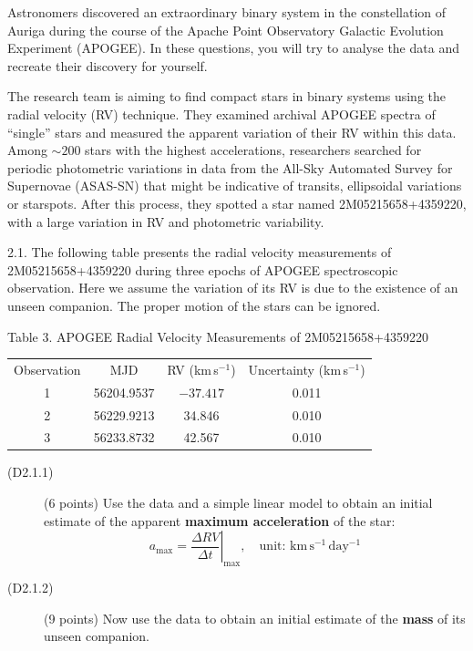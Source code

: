 Astronomers discovered an extraordinary binary system in the constellation of
Auriga during the course of the Apache Point Observatory Galactic Evolution
Experiment (APOGEE). In these questions, you will try to analyse the data and
recreate their discovery for yourself.

The research team is aiming to find compact stars in binary systems using the
radial velocity (RV) technique. They examined archival APOGEE spectra of
``single'' stars and measured the apparent variation of their RV within this
data. Among ${\sim}200$ stars with the highest accelerations, researchers
searched for periodic photometric variations in data from the All-Sky
Automated Survey for Supernovae (ASAS-SN) that might be indicative of
transits, ellipsoidal variations or starspots. After this process, they
spotted a star named 2M05215658+4359220, with a large variation in RV and
photometric variability.

2.1. The following table presents the radial velocity measurements of
2M05215658+4359220 during three epochs of APOGEE spectroscopic observation.
Here we assume the variation of its RV is due to the existence of an unseen
companion. The proper motion of the stars can be ignored.

\begin{center}
Table 3. APOGEE Radial Velocity Measurements of 2M05215658+4359220

\medskip
\begin{tabular}{cccc}
Observation & MJD & RV (km\,s$^{-1}$) & Uncertainty (km\,s$^{-1}$) \\
1 & 56204.9537 & $-37.417$ & 0.011 \\
2 & 56229.9213 & 34.846 & 0.010 \\
3 & 56233.8732 & 42.567 & 0.010 \\
\end{tabular}
\end{center}

\begin{description}
\item[(D2.1.1)] (6 points) Use the data and a simple linear model to obtain
  an initial estimate of the apparent \textbf{maximum acceleration} of the
  star:
  \[ a_{\max} = \left.\frac{\Delta RV}{\Delta t}\right|_{\max}, \quad
     \mbox{unit: } \mathrm{km\,s^{-1}\,day^{-1}} \]
\item[(D2.1.2)] (9 points) Now use the data to obtain an initial estimate of
  the \textbf{mass} of its unseen companion.
\end{description}

